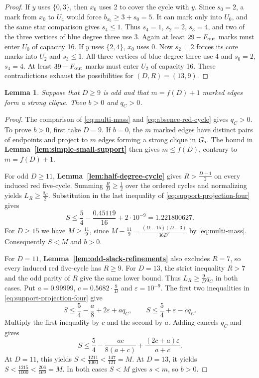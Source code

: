 \documentclass[preprint,11pt,numbers]{elsarticle-arxiv}
\numberwithin{equation}{section}
\newtheorem{lemma}[theorem]{Lemma}
\theoremstyle{definition}
\begin{document}
\begin{proof}
If $y$ uses $\{0,3\}$, then $x_0$ uses 2 to cover the cycle with
$y$. Since $s_0=2$, a mark from $x_0$ to $U_4$ would force
$b_{x_0}\ge3+s_0=5$. It can mark only into $U_0$, and the same
star comparison gives $s_4\le1$. Thus $s_4=1$, $s_2=2$, $s_3=4$,
and two of the three vertices of blue degree three use 3. Again
at least $29-F_{\rm out}$ marks must enter $U_0$ of capacity 16.
If $y$ uses $\{2,4\}$, $x_0$ uses 0. Now $s_2=2$ forces its
core marks into $U_2$ and $s_3\le1$. All three vertices of blue
degree three use 4 and $s_0=2$, $s_4=4$. At least $39-F_{\rm out}$
marks must enter $U_2$ of capacity 16. These contradictions exhaust
the possibilities for $(D,R)=(13,9)$.
\relax\space%

\end{proof}
\relax\space%

\begin{lemma}\label{lem:extra-copy-required}\label{lem:counterexample-cycle}
Suppose that $D\geq9$ is odd and that $m=f(D)+1$ marked edges form
a strong clique. Then $b>0$ and $q_C>0$.
\end{lemma}

\begin{proof}
The comparison of \eqref{eq:multi-mass} and
\eqref{eq:absence-red-cycle} gives $q_C>0$. To prove $b>0$,
first take $D=9$. If $b=0$, the $m$ marked edges have distinct
pairs of endpoints and project to $m$ edges forming a strong
clique in $G_{\rm s}$. The bound in
\textbf{Lemma~\ref{lem:simple-small-support}} then gives
$m\leq f(D)$, contrary to $m=f(D)+1$.

For odd $D\geq11$, \textbf{Lemma~\ref{lem:half-degree-cycle}}
gives $R>\frac{D+1}{2}$ on every induced red five-cycle.
Summing $\frac{R}{D}\geq\frac{1}{2}$ over the ordered cycles
and normalizing yields $L_R\geq\frac{q_C}{2}$. Substitution
in the last inequality of \eqref{eq:support-projection-four}
gives
\[
 S\leq\frac{5}{4}-\frac{0.45119}{16}+2\cdot10^{-9}
   =1.221800627.
\]
For $D\geq15$ we have $M\geq\frac{11}{9}$, since
$M-\frac{11}{9}=\frac{(D-15)(D-3)}{36D^2}$ by
\eqref{eq:multi-mass}. Consequently $S<M$ and $b>0$.

For $D=11$, \textbf{Lemma~\ref{lem:odd-slack-refinements}}
also excludes $R=7$, so every induced red five-cycle has $R\geq9$.
For $D=13$, the strict inequality $R>7$ and the odd parity of $R$
give the same lower bound. Thus $L_R\geq\frac{9}{D}q_C$ in both
cases. Put $a=0.99999$, $c=0.5682\cdot\frac{9}{D}$ and
$\varepsilon=10^{-9}$. The first two inequalities
in \eqref{eq:support-projection-four} give
\[
 S\leq\frac{5}{4}-\frac{a}{8}+2\varepsilon+a q_C,
 \qquad
 S\leq\frac{5}{4}+\varepsilon-c q_C .
\]
Multiply the first inequality by $c$ and the second by $a$.
Adding cancels $q_C$ and gives
\[
 S\leq\frac{5}{4}-\frac{ac}{8(a+c)}
             +\frac{(2c+a)\varepsilon}{a+c}.
\]
At $D=11$, this yields $S<\frac{1211}{1000}<\frac{147}{121}=M$.
At $D=13$, it yields $S<\frac{1215}{1000}<\frac{206}{169}=M$.
In both cases $S<M$ gives $s<m$, so $b>0$.
\end{proof}
\end{document}
